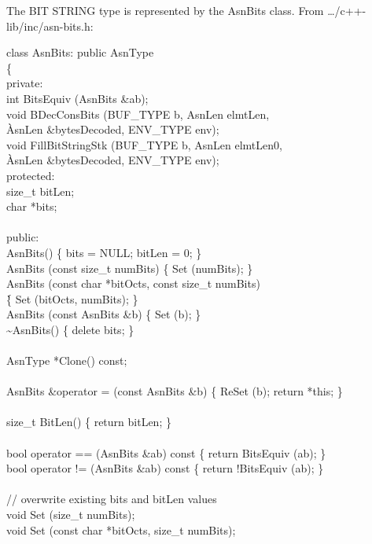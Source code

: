 The BIT STRING type is represented by the {\C AsnBits} class.  From\linebreak
{\ufn \dots/c++-lib/inc/asn-bits.h}:
\begin{Ccode}
class AsnBits: public AsnType\\
\{\\
private:\+\\
  int				\>\>BitsEquiv (AsnBits \&ab);\\
  void				\>\>BDecConsBits (BUF\_TYPE b, AsnLen elmtLen,\\
					\`AsnLen \&bytesDecoded, ENV\_TYPE env);\\
  void				\>\>FillBitStringStk (BUF\_TYPE b, AsnLen elmtLen0,\\
					\`AsnLen \&bytesDecoded, ENV\_TYPE env);\\
\<protected:\\
  size\_t			\>\>bitLen;\\
  char				\>\>*bits;\\
\\
\<public:\\
				\>\>AsnBits() \{ bits = NULL; bitLen = 0; \}\\
				\>\>AsnBits (const size\_t numBits) \{ Set (numBits); \}\\
				\>\>AsnBits (const char *bitOcts, const size\_t numBits) \\
					\`\{ Set (bitOcts, numBits); \}\\
				\>\>AsnBits (const AsnBits \&b) \{ Set (b); \}\\
				\>\>\~{}AsnBits() \{ delete bits; \}\\
\\
  AsnType			\>\>*Clone() const;\\
\\
  AsnBits			\>\>\&operator = (const AsnBits \&b) \{ ReSet (b); return *this; \}\\
\\
  size\_t			\>\>BitLen() \{ return bitLen; \}\\
\\
  bool				\>\>operator == (AsnBits \&ab) const \{ return BitsEquiv (ab); \}\\
  bool				\>\>operator != (AsnBits \&ab) const \{ return !BitsEquiv (ab); \}\\
\\
  // overwrite existing bits and bitLen values\\
  void				\>\>Set (size\_t numBits);\\
  void				\>\>Set (const char *bitOcts, size\_t numBits);\\

\end{Ccode}
